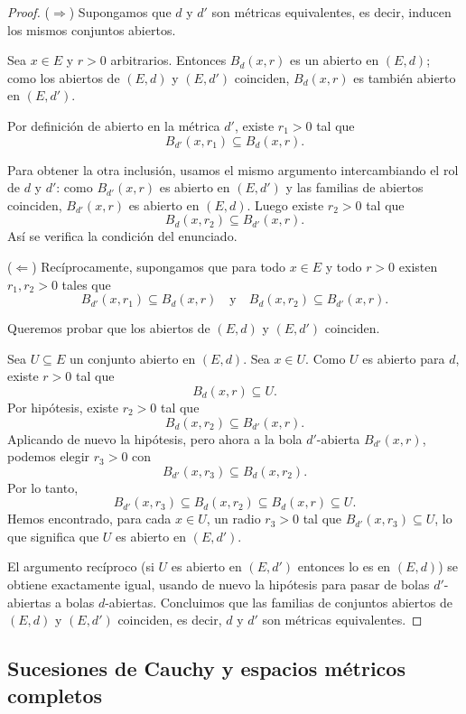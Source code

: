 \begin{proof}
($\Rightarrow$) Supongamos que $d$ y $d'$ son métricas equivalentes, es decir,
inducen los mismos conjuntos abiertos.

Sea $x \in E$ y $r>0$ arbitrarios. Entonces $B_d(x,r)$ es un abierto en
$(E,d)$; como los abiertos de $(E,d)$ y $(E,d')$ coinciden, $B_d(x,r)$
es también abierto en $(E,d')$.

Por definición de abierto en la métrica $d'$, existe $r_1>0$ tal que
\[
B_{d'}(x,r_1) \subseteq B_d(x,r).
\]

Para obtener la otra inclusión, usamos el mismo argumento intercambiando
el rol de $d$ y $d'$: como $B_{d'}(x,r)$ es abierto en $(E,d')$ y las
familias de abiertos coinciden, $B_{d'}(x,r)$ es abierto en $(E,d)$.
Luego existe $r_2>0$ tal que
\[
B_d(x,r_2) \subseteq B_{d'}(x,r).
\]
Así se verifica la condición del enunciado.

\medskip

($\Leftarrow$) Recíprocamente, supongamos que para todo $x \in E$ y
todo $r>0$ existen $r_1,r_2>0$ tales que
\[
B_{d'}(x,r_1) \subseteq B_d(x,r)
\quad\text{y}\quad
B_d(x,r_2) \subseteq B_{d'}(x,r).
\]

Queremos probar que los abiertos de $(E,d)$ y $(E,d')$ coinciden.

Sea $U \subseteq E$ un conjunto abierto en $(E,d)$. Sea $x \in U$.
Como $U$ es abierto para $d$, existe $r>0$ tal que
\[
B_d(x,r) \subseteq U.
\]
Por hipótesis, existe $r_2>0$ tal que
\[
B_d(x,r_2) \subseteq B_{d'}(x,r).
\]
Aplicando de nuevo la hipótesis, pero ahora a la bola $d'$-abierta
$B_{d'}(x,r)$, podemos elegir $r_3>0$ con
\[
B_{d'}(x,r_3) \subseteq B_d(x,r_2).
\]
Por lo tanto,
\[
B_{d'}(x,r_3) \subseteq B_d(x,r_2) \subseteq B_d(x,r) \subseteq U.
\]
Hemos encontrado, para cada $x \in U$, un radio $r_3>0$ tal que
$B_{d'}(x,r_3) \subseteq U$, lo que significa que $U$ es abierto en
$(E,d')$.

El argumento recíproco (si $U$ es abierto en $(E,d')$ entonces lo es
en $(E,d)$) se obtiene exactamente igual, usando de nuevo la hipótesis
para pasar de bolas $d'$-abiertas a bolas $d$-abiertas. Concluimos que
las familias de conjuntos abiertos de $(E,d)$ y $(E,d')$ coinciden, es
decir, $d$ y $d'$ son métricas equivalentes.
\end{proof}

\subsection{Sucesiones de Cauchy y espacios métricos completos}

